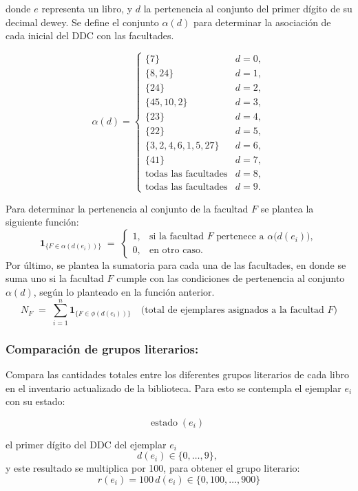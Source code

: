 \documentclass[spanish]{ieee_upb}
\begin{document}
donde \(e\) representa un libro, y \(d\) la pertenencia al conjunto del primer dígito de su decimal dewey. Se define el conjunto \(\alpha(d)\) para determinar la asociación de cada inicial del DDC con las facultades.

\[
  \alpha(d)=
  \begin{cases}
    \{7\}                         & d=0,\\
    \{8,24\}                      & d=1,\\
    \{24\}                        & d=2,\\
    \{45,10,2\}                   & d=3,\\
    \{23\}                        & d=4,\\
    \{22\}                        & d=5,\\
    \{3,2,4,6,1,5,27\}            & d=6,\\
    \{41\}                        & d=7,\\
    \text{todas las facultades}   & d=8,\\
    \text{todas las facultades}   & d=9.
  \end{cases}
\]

Para determinar la pertenencia al conjunto de la facultad \(F\) se plantea la siguiente función:
\[
  \mathbf 1_{\{F\in\alpha(d(e_i))\}} \;=\;
  \begin{cases}
    1, & \text{si la facultad }F\text{ pertenece a }\alpha\bigl(d(e_i)\bigr),\\
    0, & \text{en otro caso.}
  \end{cases}
\]
Por último, se plantea la sumatoria para cada una de las facultades, en donde se suma uno si la facultad \(F\) cumple con las condiciones de pertenencia al conjunto \(\alpha(d)\), según lo planteado en la función anterior. 
\[
  N_F
  \;=\;
  \sum_{i=1}^{n}
    \mathbf 1_{\{F\in\phi(d(e_i))\}}
  \quad
  \bigl(\text{total de ejemplares asignados a la facultad }F\bigr)
\]

\subsubsection{Comparación de grupos literarios: }
Compara las cantidades totales entre los diferentes grupos literarios de cada libro en el inventario actualizado de la biblioteca. Para esto se contempla el ejemplar \(e_i\) con su estado:

\[
  \operatorname{estado}(e_i)\; \; 
  \]

el primer dígito del DDC del ejemplar \(e_i\)
  \[
  d(e_i)\in\{0,\dots,9\},\; 
\]
  y este resultado se multiplica por 100, para obtener el grupo literario:
  \[
  r(e_i)=100\,d(e_i)\in\{0,100,\dots,900\}
  \]
\end{document}
